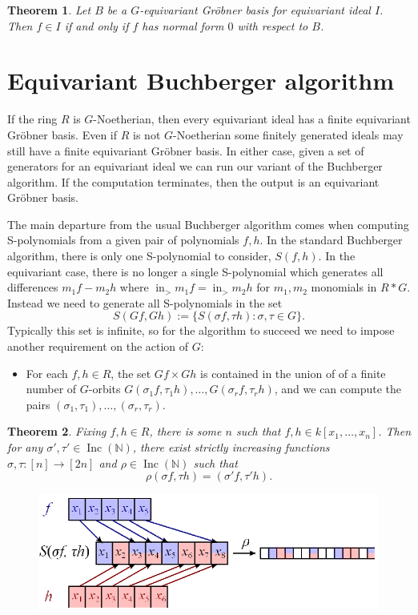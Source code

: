 \documentclass[10pt]{amsart}
\newtheorem{theorem}{Theorem}[section]
\theoremstyle{definition}
\theoremstyle{remark}
\numberwithin{equation}{section}
\newcommand{\B}[1]{\mathbb #1}
\newcommand{\<}{\langle}
\renewcommand{\>}{\rangle}
\newcommand{\LT}{\operatorname{in}_>}
\newcommand{\Inc}{\operatorname{Inc}(\B N)}
\begin{document}
\begin{theorem}
Let $B$ be a $G$-equivariant Gr\"obner basis for equivariant ideal $I$.  Then $f \in I$ if and only if $f$ has normal form $0$ with respect to $B$.
\end{theorem}

\section{Equivariant Buchberger algorithm}
If the ring $R$ is $G$-Noetherian, then every equivariant ideal has a finite equivariant Gr\"obner basis.  Even if $R$ is not $G$-Noetherian some finitely generated ideals may still have a finite equivariant Gr\"obner basis.  In either case, given a set of generators for an equivariant ideal we can run our variant of the Buchberger algorithm. If the computation terminates, then the output is an equivariant Gr\"obner basis.

The main departure from the usual Buchberger algorithm comes when computing S-polynomials from a given pair of polynomials $f,h$.  In the standard Buchberger algorithm, there is only one S-polynomial to consider, $S(f,h)$.  In the equivariant case, there is no longer a single S-polynomial which generates all differences $m_1f - m_2h$ where $\LT m_1f = \LT m_2h$ for $m_1,m_2$ monomials in $R*G$.  Instead we need to generate all S-polynomials in the set
 \[ S(Gf,Gh) := \{ S(\sigma f, \tau h): \sigma,\tau \in G\}. \]
Typically this set is infinite, so for the algorithm to succeed we need to impose another requirement on the action of $G$:
\begin{itemize}
 \item For each $f,h \in R$, the set $Gf \times Gh$ is contained in the union of of a finite number of $G$-orbits $G(\sigma_1 f, \tau_1 h),\ldots,G(\sigma_r f, \tau_r h)$, and we can compute the pairs $(\sigma_1,\tau_1),\ldots,(\sigma_r,\tau_r)$.
\end{itemize}

\begin{theorem}
 Fixing $f,h \in R$, there is some $n$ such that $f,h \in k[x_1,\ldots,x_n]$.  Then for any $\sigma', \tau' \in \Inc$, there exist strictly increasing functions $\sigma,\tau: [n] \to [2n]$ and $\rho \in \Inc$ such that
  \[ \rho (\sigma f, \tau h) = (\sigma' f, \tau' h). \]
\end{theorem}

\begin{figure}[h]
  \centering
  \includegraphics[width=.7\textwidth]{incmap.ps}
\end{figure}
\end{document}

